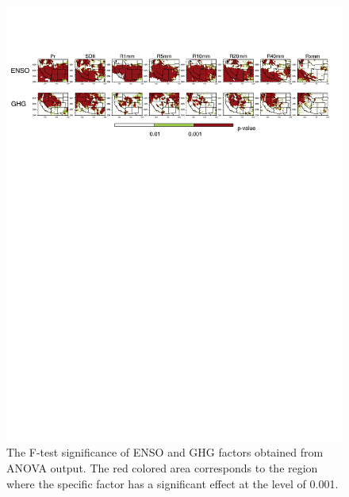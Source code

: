 \documentclass{ametsoc}
\begin{document}
\begin{figure}
\begin{center}
\includegraphics[width=6in]{lm_fit_pvalue.pdf}
\caption{The F-test significance of ENSO and GHG factors obtained from ANOVA output. The red colored area corresponds to the region where the specific factor has a significant effect at the level of 0.001.}
\end{center}
\label{fig:S8}
\end{figure}

\end{document}
